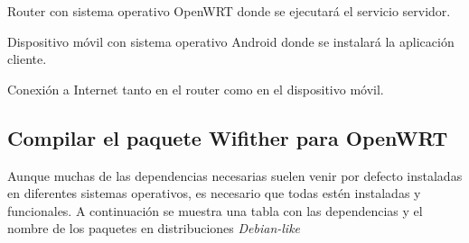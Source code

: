 \documentclass{article}
\begin{document}
        Router con sistema operativo OpenWRT donde se ejecutará el servicio servidor.

        Dispositivo móvil con sistema operativo Android donde se instalará la aplicación cliente.

        Conexión a Internet tanto en el router como en el dispositivo móvil.

    \subsection{Compilar el paquete Wifither para OpenWRT}
        Aunque muchas de las dependencias necesarias suelen venir por defecto instaladas en diferentes sistemas operativos, es necesario que todas estén instaladas y funcionales. A continuación se muestra una tabla con las dependencias y el nombre de los paquetes en distribuciones \textit{Debian-like} 
\end{document}
